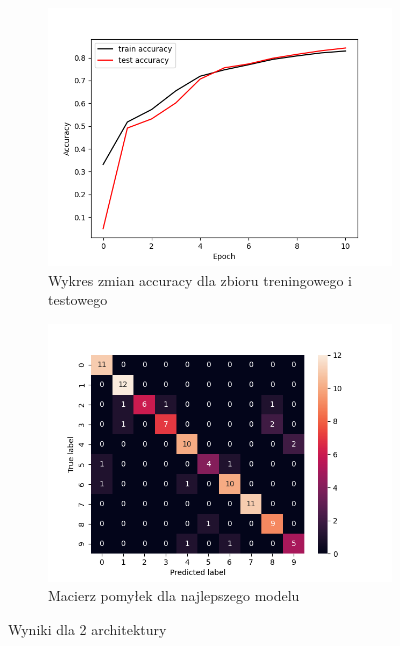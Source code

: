 \documentclass[10pt]{article}
\begin{document}
\begin{figure}[htbp]
    \centering
    \begin{subfigure}[b]{0.2\textwidth}
        \includegraphics[width=\textwidth]{img/magda/magda_MNIST_2_accuracy_10epochs}
        \caption{Wykres zmian accuracy dla zbioru treningowego i testowego}
        \label{fig:sub3}
    \end{subfigure}
    \begin{subfigure}[b]{0.2\textwidth}
        \includegraphics[width=\textwidth]{img/magda/magda_MNIST_2_matrix_best}
        \caption{Macierz pomyłek dla najlepszego modelu}
        \label{fig:sub4}
    \end{subfigure}
    \caption{Wyniki dla 2 architektury}
    \label{fig:eksperyment1_mnist_2_magda}
\end{figure}
\end{document}
